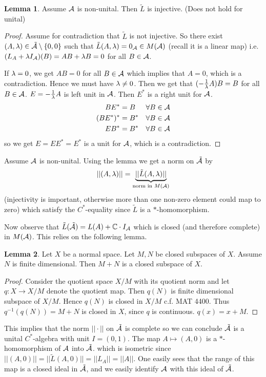 \documentclass[10pt,english,a4paper]{article}
\theoremstyle{definition}
\newtheorem*{lemma}{Lemma}
\begin{document}
\begin{lemma}
    Assume $\mathcal{A}$ is non-unital. Then $\tilde{L}$ is injective. (Does not hold for unital) 
\end{lemma}
\begin{proof}
    Assume for contradiction that $\tilde{L}$ is not injective. So there exist 
$(A,\lambda) \in \tilde{\mathcal{A}}\setminus \{0,0\}$ such that $\tilde{L}(A,\lambda) = 0_{\mathcal{A}} \in M(\mathcal{A})$ (recall it is a linear map)
i.e. $(L_A + \lambda I_{\mathcal{A}})(B) = AB + \lambda B = 0$ for all $B \in \mathcal{A}$.

If $\lambda = 0$, we get $AB = 0$ for all $B \in \mathcal{A}$ which implies that $A =0$,
which is a contradiction. Hence we must have $\lambda \neq 0$. 
Then we get that $(-\tfrac{1}{\lambda}A)B = B$ for all $B \in \mathcal{A}$. $E = -\tfrac{1}{\lambda}A$
is left unit in $\mathcal{A}$. Then $E^*$ is a right unit for $\mathcal{A}$.
\begin{align*}
    BE^* &= B  &&\forall B \in \mathcal{A} \\
    (BE^*)^* &= B^*  &&\forall B \in \mathcal{A} \\
    EB^* &= B^*  &&\forall B \in \mathcal{A}
\end{align*}
so we get $E = EE^* = E^*$ is a unit for $\mathcal{A}$, which is a contradiction. 
\end{proof}

Assume $\mathcal{A}$ is non-unital. Using the lemma we get a norm on $\tilde{\mathcal{A}}$ by
\[
||(A,\lambda)|| = \underbrace{||\tilde{L}(A,\lambda)||}_{\text{norm in }M(\mathcal{A})}
\]
(injectivity is important, otherwise more than one non-zero element could map to zero)
which satisfy the $C^*$-equality since $\tilde{L}$ is a $*$-homomorphism.

Now observe that $\tilde{L}(\tilde{\mathcal{A}}) = L(A) + \mathbb{C} \cdot I_{\mathcal{A}}$ which is closed 
(and therefore complete) in $M(\mathcal{A})$. This relies on the following lemma.

\begin{lemma}
    Let $X$ be a normal space. Let $M,N$ be closed subspaces of $X$. Assume $N$ is finite 
    dimensional. Then $M+N$ is a closed subspace of $X$.
\end{lemma}
\begin{proof}
    Consider the quotient space $X/M$ with its quotient norm and let $q\colon X
    \to X/M$ denote the quotient map. Then $q(N)$ is finite dimensional subspace of
    $X/M$. Hence $q(N)$ is closed in $X/M$ c.f. MAT 4400. Thus $q^{-1} (q(N)) = M+N$
     is closed in $X$, since $q$ is continuous.  $q(x) = x+M$. 
\end{proof}
This implies that the norm $||\cdot||$ on $\tilde{\mathcal{A}}$ is complete so we can 
conclude $\tilde{\mathcal{A}}$ is a unital $C^*$-algebra with unit $I=(0,1)$.
The map $A \mapsto (A,0)$ is a $*$-homomorphism of $\mathcal{A}$ into $\tilde{\mathcal{A}}$.
which is isometric since $||(A,0)|| = ||\tilde{L}(A,0)|| = ||L_A||=||A||$.
One easily sees that the range of this map is a closed ideal in $\tilde{\mathcal{A}}$,
and we easily identify $\mathcal{A}$ with this ideal of $\tilde{\mathcal{A}}$. 
\end{document}
